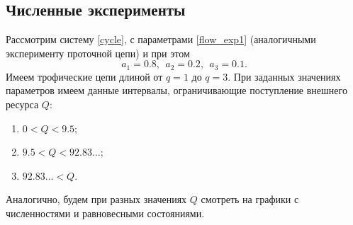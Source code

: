 \subsection{Численные эксперименты}
Рассмотрим систему \eqref{cycle}, с параметрами \eqref{flow_exp1} (аналогичными эксперименту проточной цепи) и при этом
\begin{equation*}
    a_1 = 0.8, ~~ a_2 = 0.2, ~~ a_3 = 0.1. 
\end{equation*}
Имеем трофические цепи длиной от \(q=1\) до \(q=3\). При заданных значениях параметров имеем данные интервалы, ограничивающие поступление внешнего ресурса \(Q\):
\begin{enumerate}
    \item \( 0 < Q < 9.5 \);
    \item \( 9.5 < Q < 92.83\ldots \);
    \item \( 92.83\ldots < Q\).
\end{enumerate}
Аналогично, будем при разных значениях \(Q\) смотреть на графики с численностями и равновесными состояниями.

